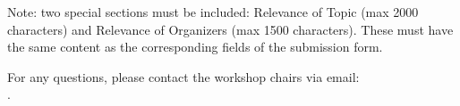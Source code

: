 \documentclass[runningheads]{llncs}
\begin{document}
Note: two special sections must be included: Relevance of Topic (max 2000 characters) and Relevance of Organizers (max 1500 characters). These must have the same content as the corresponding fields of the submission form.

For any questions, please contact the workshop chairs via email: \\ .



%
%
% 
% 
\end{document}
